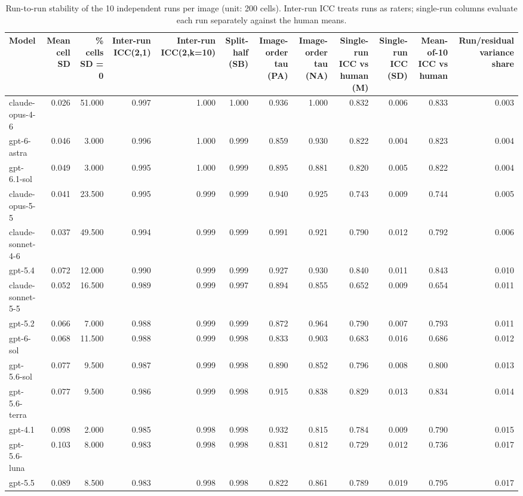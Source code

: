 \begin{table}
\caption{Run-to-run stability of the 10 independent runs per image (unit: 200 cells). Inter-run ICC treats runs as raters; single-run columns evaluate each run separately against the human means.}
\begin{tabular}{lrrrrrrrrrrr}
\toprule
Model & Mean cell SD & \% cells SD = 0 & Inter-run ICC(2,1) & Inter-run ICC(2,k=10) & Split-half (SB) & Image-order tau (PA) & Image-order tau (NA) & Single-run ICC vs human (M) & Single-run ICC (SD) & Mean-of-10 ICC vs human & Run/residual variance share \\
\midrule
claude-opus-4-6 & 0.026 & 51.000 & 0.997 & 1.000 & 1.000 & 0.936 & 1.000 & 0.832 & 0.006 & 0.833 & 0.003 \\
gpt-6-astra & 0.046 & 3.000 & 0.996 & 1.000 & 0.999 & 0.859 & 0.930 & 0.822 & 0.004 & 0.823 & 0.004 \\
gpt-6.1-sol & 0.049 & 3.000 & 0.995 & 1.000 & 0.999 & 0.895 & 0.881 & 0.820 & 0.005 & 0.822 & 0.004 \\
claude-opus-5-5 & 0.041 & 23.500 & 0.995 & 0.999 & 0.999 & 0.940 & 0.925 & 0.743 & 0.009 & 0.744 & 0.005 \\
claude-sonnet-4-6 & 0.037 & 49.500 & 0.994 & 0.999 & 0.999 & 0.991 & 0.921 & 0.790 & 0.012 & 0.792 & 0.006 \\
gpt-5.4 & 0.072 & 12.000 & 0.990 & 0.999 & 0.999 & 0.927 & 0.930 & 0.840 & 0.011 & 0.843 & 0.010 \\
claude-sonnet-5-5 & 0.052 & 16.500 & 0.989 & 0.999 & 0.997 & 0.894 & 0.855 & 0.652 & 0.009 & 0.654 & 0.011 \\
gpt-5.2 & 0.066 & 7.000 & 0.988 & 0.999 & 0.999 & 0.872 & 0.964 & 0.790 & 0.007 & 0.793 & 0.011 \\
gpt-6-sol & 0.068 & 11.500 & 0.988 & 0.999 & 0.998 & 0.833 & 0.903 & 0.683 & 0.016 & 0.686 & 0.012 \\
gpt-5.6-sol & 0.077 & 9.500 & 0.987 & 0.999 & 0.998 & 0.890 & 0.852 & 0.796 & 0.008 & 0.800 & 0.013 \\
gpt-5.6-terra & 0.077 & 9.500 & 0.986 & 0.999 & 0.998 & 0.915 & 0.838 & 0.829 & 0.013 & 0.834 & 0.014 \\
gpt-4.1 & 0.098 & 2.000 & 0.985 & 0.998 & 0.998 & 0.932 & 0.815 & 0.784 & 0.009 & 0.790 & 0.015 \\
gpt-5.6-luna & 0.103 & 8.000 & 0.983 & 0.998 & 0.998 & 0.831 & 0.812 & 0.729 & 0.012 & 0.736 & 0.017 \\
gpt-5.5 & 0.089 & 8.500 & 0.983 & 0.998 & 0.998 & 0.822 & 0.861 & 0.789 & 0.019 & 0.795 & 0.017 \\

\end{tabular}
\end{table}
